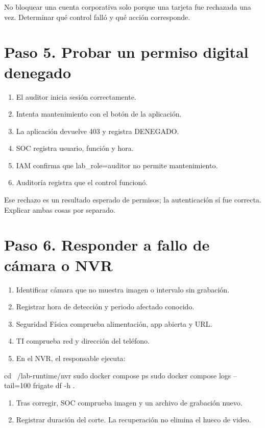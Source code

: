 \documentclass[12pt,a4paper]{article}
\begin{document}
No bloquear una cuenta corporativa solo porque una tarjeta fue rechazada una vez. Determinar qué control falló y qué acción corresponde.\par
{}\section*{Paso 5. Probar un permiso digital denegado}
\begin{enumerate}
\item El auditor inicia sesión correctamente.
\item Intenta mantenimiento con el botón de la aplicación.
\item La aplicación devuelve 403 y registra DENEGADO.
\item SOC registra usuario, función y hora.
\item IAM confirma que \textnormal{lab\_\allowbreak{}role=\allowbreak{}auditor} no permite mantenimiento.
\item Auditoría registra que el control funcionó.
\end{enumerate}
Ese rechazo es un resultado esperado de permisos; la autenticación sí fue correcta. Explicar ambas cosas por separado.\par
{}\section*{Paso 6. Responder a fallo de cámara o NVR}
\begin{enumerate}
\item Identificar cámara que no muestra imagen o intervalo sin grabación.
\item Registrar hora de detección y periodo afectado conocido.
\item Seguridad Física comprueba alimentación, app abierta y URL.
\item TI comprueba red y dirección del teléfono.
\item En el NVR, el responsable ejecuta:
\end{enumerate}
\begin{Comandos}
cd ~/lab-runtime/nvr
sudo docker compose ps
sudo docker compose logs --tail=100 frigate
df -h .
\end{Comandos}
\begin{enumerate}
\item Tras corregir, SOC comprueba imagen y un archivo de grabación nuevo.
\item Registrar duración del corte. La recuperación no elimina el hueco de video.
\end{enumerate}
\end{document}

